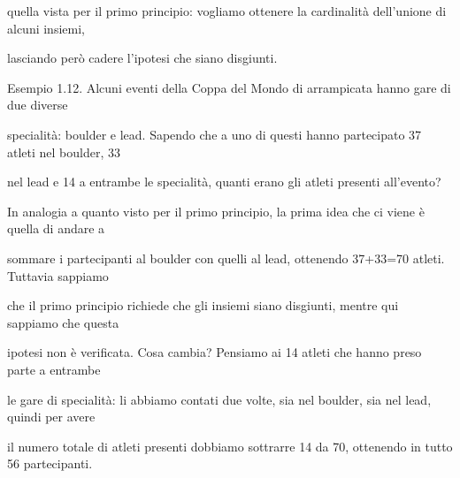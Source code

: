 \documentclass[a4paper,portrait,12pt]{article}
\begin{document}
\begin{flushleft}
quella vista per il primo principio: vogliamo ottenere la cardinalit\`{a} dell'unione di alcuni insiemi,
\end{flushleft}


\begin{flushleft}
lasciando per\`{o} cadere l'ipotesi che siano disgiunti.
\end{flushleft}


\begin{flushleft}
Esempio 1.12. Alcuni eventi della Coppa del Mondo di arrampicata hanno gare di due diverse
\end{flushleft}


\begin{flushleft}
specialit\`{a}: boulder e lead. Sapendo che a uno di questi hanno partecipato 37 atleti nel boulder, 33
\end{flushleft}


\begin{flushleft}
nel lead e 14 a entrambe le specialit\`{a}, quanti erano gli atleti presenti all'evento?
\end{flushleft}


\begin{flushleft}
In analogia a quanto visto per il primo principio, la prima idea che ci viene \`{e} quella di andare a
\end{flushleft}


\begin{flushleft}
sommare i partecipanti al boulder con quelli al lead, ottenendo 37+33=70 atleti. Tuttavia sappiamo
\end{flushleft}


\begin{flushleft}
che il primo principio richiede che gli insiemi siano disgiunti, mentre qui sappiamo che questa
\end{flushleft}


\begin{flushleft}
ipotesi non \`{e} verificata. Cosa cambia? Pensiamo ai 14 atleti che hanno preso parte a entrambe
\end{flushleft}


\begin{flushleft}
le gare di specialit\`{a}: li abbiamo contati due volte, sia nel boulder, sia nel lead, quindi per avere
\end{flushleft}


\begin{flushleft}
il numero totale di atleti presenti dobbiamo sottrarre 14 da 70, ottenendo in tutto 56 partecipanti.
\end{flushleft}
\end{document}
